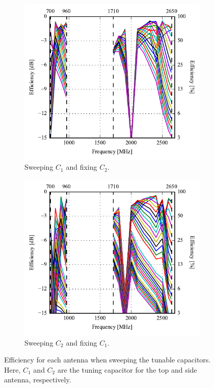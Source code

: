 \begin{figure}[htbp]
    \centering
    \begin{subfigure}{0.49\linewidth}
        \includegraphics{img/tech_sol/monopole/highband/sim/eff_top.pdf}
        \caption{Sweeping $C_1$ and fixing $C_2$.}
    \end{subfigure}
    \hfill
    \begin{subfigure}{0.49\linewidth}
        \includegraphics{img/tech_sol/monopole/highband/sim/eff_side.pdf}
        \caption{Sweeping $C_2$ and fixing $C_1$.}
    \end{subfigure}
    \caption{Efficiency for each antenna when sweeping the tunable capacitors. Here, $C_1$ and $C_2$ are the tuning capacitor for the top and side antenna, respectively.}
    \label{fig:eff_mono_modi_sim_free}
\end{figure}

